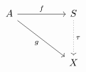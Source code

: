 \[
    \begin{tikzcd}
        A \arrow[rr, "f"] \arrow[rrdd, "g"'] &  & S \arrow[dd, "\tau", dotted] \\
                                                      &  &                                       \\
                                                      &  & X                                    
    \end{tikzcd}
\]